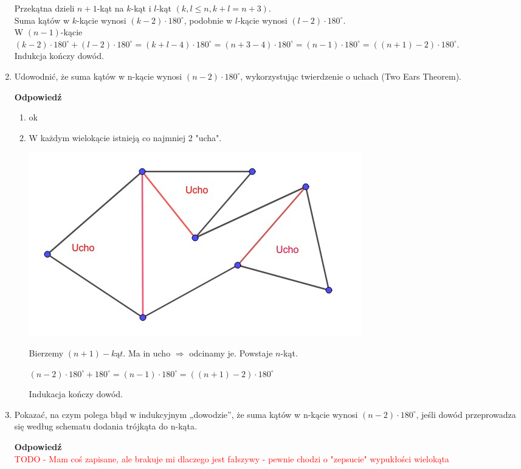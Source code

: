 \documentclass[12pt,a4paper]{article}
\newcounter{twierdzenie}
\theoremstyle{break}
\newcommand{\Odp}[1]{
		\begin{mdframed}[style=zadanie]
			\textbf{Odpowiedź}\\
			#1
		\end{mdframed}
	}
\begin{document}
\begin{enumerate}[1.]
{\begin{enumerate}[I]
			Przekątna dzieli $n+1$-kąt na $k$-kąt i $l$-kąt $(k,l\leq n, k+l=n+3)$.\\
			
			Suma kątów w $k$-kącie wynosi $(k-2)\cdot180^\circ$, podobnie w $l$-kącie wynosi $(l-2)\cdot180^\circ$.\\
			
			W $(n-1)$-kącie $(k-2)\cdot180^\circ + (l-2)\cdot180^\circ = (k+l-4)\cdot180^\circ=(n+3-4)\cdot180^\circ = (n-1)\cdot180^\circ =((n+1)-2)\cdot180^\circ$.\\
			
			Indukcja kończy dowód. 
		\end{enumerate}
	}
	
	\item Udowodnić, że suma kątów w n-kącie wynosi $(n - 2) \cdot 180^\circ$, wykorzystując twierdzenie o uchach (Two Ears Theorem).
	\Odp{
		\begin{enumerate}[I]
			\item ok
			\item W każdym wielokącie istnieją co najmniej 2 "ucha".
			
			\includegraphics[width=\linewidth]{2ind180.jpeg}
			
			Bierzemy $(n+1)-kąt$. Ma in ucho $\Rightarrow$ odcinamy je. Powstaje $n$-kąt.
			
			$(n-2)\cdot180^\circ+180^\circ = (n-1)\cdot180^\circ = ((n+1)-2)\cdot180^\circ$
			
			Indukacja kończy dowód.
		\end{enumerate}
	}
	
	\item Pokazać, na czym polega błąd w indukcyjnym „dowodzie”, że suma kątów w n-kącie	wynosi $(n - 2) \cdot 180^\circ$, jeśli dowód przeprowadza się według schematu dodania trójkąta do n-kąta.
	\Odp{
		\textcolor{red}{TODO - Mam coś zapisane, ale brakuje mi dlaczego jest fałszywy - pewnie chodzi o "zepsucie" wypukłości wielokąta}
		
}
\end{enumerate}
\end{document}
